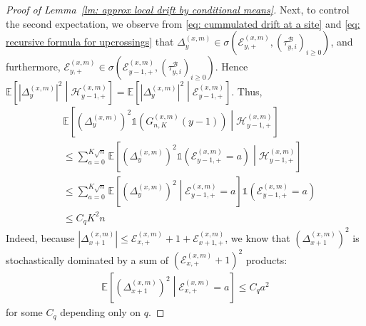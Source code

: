 \documentclass[EJP]{ejpecp} %
\newcommand{\abs}[1]{\left\vert #1 \right\vert}
\begin{document}
\begin{proof}[Proof of Lemma~\ref{lm: approx local drift by conditional means}]
	Next, to control the second expectation, we observe from \eqref{eq: cummulated drift at a site} and \eqref{eq: recursive formula for upcrossings} that $\Delta_y^{(x,m)} \in \sigma \left(\mathcal{E}_{y, +}^{(x,m)}, (\tau_{y,i}^{\mathscr{B}})_{i \ge 0}\right)$, and furthermore, $\mathcal{E}_{y, +}^{(x,m)} \in \sigma \left(\mathcal{E}_{y-1, +}^{(x,m)}, (\tau_{y,i}^{\mathscr{B}})_{i \ge 0}\right)$. Hence $\mathbb{E}\left[|\Delta_y^{(x,m)}|^2 \middle| \mathcal{H}_{y-1, +}^{(x,m)}\right] = \mathbb{E}\left[|\Delta_y^{(x,m)}|^2 \middle| \mathcal{E}_{y-1, +}^{(x,m)}\right]$. Thus,
	\begin{align*}
		& \mathbb{E}\left[ \left(\Delta_y^{(x,m)}\right)^2 \mathbb{1}\left(G_{n, K}^{(x,m)}(y-1)\right) \middle| \mathcal{H}_{y-1, +}^{(x,m)}  \right] \\
		&\le \sum_{a = 0}^{K \sqrt{n}} \mathbb{E}\left[ \left(\Delta_y^{(x,m)}\right)^2 \mathbb{1}\left( \mathcal{E}_{y-1, +}^{(x,m)} = a \right) \middle| \mathcal{H}_{y-1, +}^{(x,m)} \right] \\
		&\le \sum_{a = 0}^{K \sqrt{n}} \mathbb{E}\left[ \left(\Delta_y^{(x,m)}\right)^2 \middle| \mathcal{E}_{y-1, +}^{(x,m)} = a \right] \mathbb{1}\left( \mathcal{E}_{y-1, +}^{(x,m)} = a \right) \\
		&\le C_q K^2 n
	\end{align*}
	Indeed, because $\abs{\Delta_{x+1}^{(x,m)}} \leq  \mathcal{E}_{x,+}^{(x,m)}+1 + \mathcal{E}_{x+1,+}^{(x,m)}$,  
	we know that $ \left(\Delta_{x+1}^{(x,m)} \right)^2$ is stochastically dominated by a sum of $\left(\mathcal{E}_{x,+}^{(x,m)}+1\right)^2$ products:
	\begin{align*}
		\mathbb{E}\left[ \left(\Delta_{x+1}^{(x,m)}\right)^2 \middle| \mathcal{E}_{x,+}^{(x,m)} = a  \right]  \leq C_q a^2
	\end{align*}
	for some $C_q$ depending only on $q$.



\end{proof}
\end{document}
